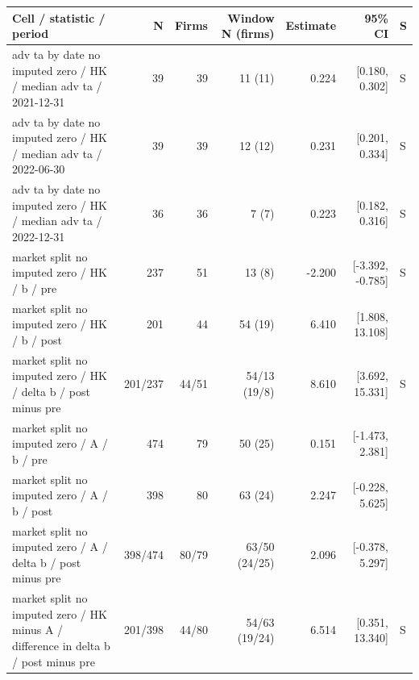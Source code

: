 \begin{threeparttable}
\begin{tabular}{p{5.7cm}rrrrrl}
\toprule
Cell / statistic / period & N & Firms & Window N (firms) & Estimate & 95\% CI & S \\
\midrule
adv ta by date no imputed zero / HK / median adv ta / 2021-12-31 & 39 & 39 & 11 (11) & 0.224 & [0.180, 0.302] & S \\
adv ta by date no imputed zero / HK / median adv ta / 2022-06-30 & 39 & 39 & 12 (12) & 0.231 & [0.201, 0.334] & S \\
adv ta by date no imputed zero / HK / median adv ta / 2022-12-31 & 36 & 36 & 7 (7) & 0.223 & [0.182, 0.316] & S \\
market split no imputed zero / HK / b / pre & 237 & 51 & 13 (8) & -2.200 & [-3.392, -0.785] & S \\
market split no imputed zero / HK / b / post & 201 & 44 & 54 (19) & 6.410 & [1.808, 13.108] &  \\
market split no imputed zero / HK / delta b / post minus pre & 201/237 & 44/51 & 54/13 (19/8) & 8.610 & [3.692, 15.331] & S \\
market split no imputed zero / A / b / pre & 474 & 79 & 50 (25) & 0.151 & [-1.473, 2.381] &  \\
market split no imputed zero / A / b / post & 398 & 80 & 63 (24) & 2.247 & [-0.228, 5.625] &  \\
market split no imputed zero / A / delta b / post minus pre & 398/474 & 80/79 & 63/50 (24/25) & 2.096 & [-0.378, 5.297] &  \\
market split no imputed zero / HK minus A / difference in delta b / post minus pre & 201/398 & 44/80 & 54/63 (19/24) & 6.514 & [0.351, 13.340] & S \\
\bottomrule
\end{tabular}
\begin{tablenotes}[flushleft]\footnotesize

\end{tablenotes}
\end{threeparttable}
